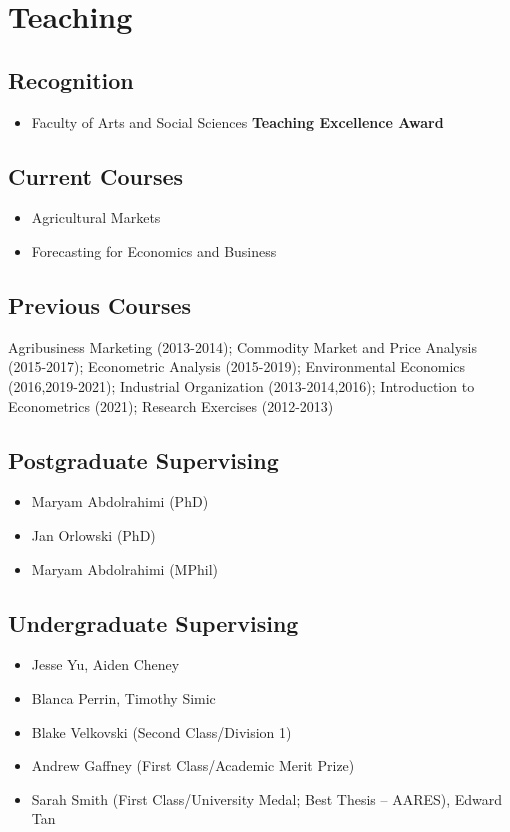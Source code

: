 \documentclass[10pt]{article}
\begin{document}
	\bigskip
	
	\section*{Teaching}
	
	\subsection*{Recognition}
	\begin{itemize}
		\item {} Faculty of Arts and Social Sciences \textbf{Teaching Excellence Award}
	\end{itemize}
	\subsection*{Current Courses}
	\begin{itemize}
		\item {} Agricultural Markets
		\item {} Forecasting for Economics and Business
	\end{itemize}
	
	\subsection*{Previous Courses}	
	Agribusiness Marketing (2013-2014); Commodity Market and Price Analysis (2015-2017); Econometric Analysis (2015-2019); Environmental Economics (2016,2019-2021); Industrial Organization (2013-2014,2016); Introduction to Econometrics (2021); Research Exercises (2012-2013)
	
	\subsection*{Postgraduate Supervising}	
	\begin{itemize}
		\item {} Maryam Abdolrahimi (PhD)
		\item {} Jan Orlowski (PhD)
		\item {} Maryam Abdolrahimi (MPhil)
	\end{itemize}

	\subsection*{Undergraduate Supervising}	
	\begin{itemize}
		\item {} Jesse Yu, Aiden Cheney
		\item {} Blanca Perrin, Timothy Simic
		\item {} Blake Velkovski (Second Class/Division 1)
		\item {} Andrew Gaffney (First Class/Academic Merit Prize)
		\item {} Sarah Smith (First Class/University Medal; Best Thesis -- AARES), Edward Tan
	\end{itemize}
	
\end{document}

